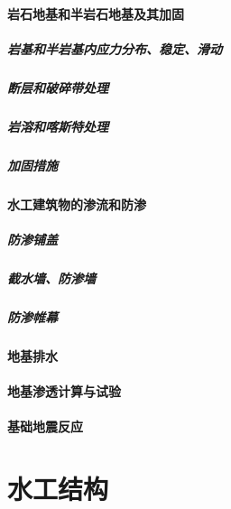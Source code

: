 \documentclass[UTF8]{../../ApplicationUniverse}
\begin{document}
        \subsubsection{岩石地基和半岩石地基及其加固}
            \paragraph{岩基和半岩基内应力分布、稳定、滑动}
            \paragraph{断层和破碎带处理}
            \paragraph{岩溶和喀斯特处理}
            \paragraph{加固措施}
        \subsubsection{水工建筑物的渗流和防渗}
            \paragraph{防渗铺盖}
            \paragraph{截水墙、防渗墙}
            \paragraph{防渗帷幕}
        \subsubsection{地基排水}
        \subsubsection{地基渗透计算与试验}
        \subsubsection{基础地震反应}







\chapter{水工结构}
\end{document}
